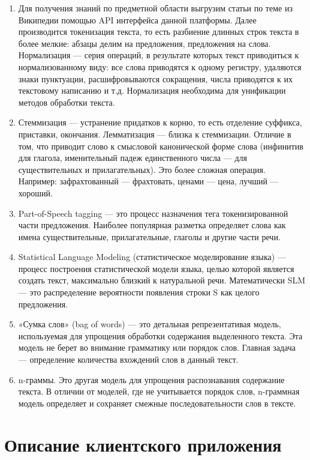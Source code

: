 \documentclass[a4paper,12pt,preview]{report} %
\begin{document}
	\begin{enumerate}
	\item Для получения знаний по предметной области выгрузим статьи по теме из Википедии помощью API интерфейса данной платформы. Далее производится токенизация текста, то есть разбиение длинных строк текста в более мелкие: абзацы делим на предложения, предложения на слова. Нормализация — серия операций, в результате которых текст приводиться к нормализованному виду: все слова приводятся к одному регистру, удаляются знаки пунктуации, расшифровываются сокращения, числа приводятся к их текстовому написанию и т.д. Нормализация необходима для унификации методов обработки текста.
	\item Стеммизация —  устранение придатков к корню, то есть отделение суффикса, приставки, окончания. Лемматизация — близка к стеммизации. Отличие в том, что приводит слово к смысловой канонической форме слова (инфинитив для глагола, именительный падеж единственного числа — для существительных и прилагательных). Это более сложная операция. Например: зафрахтованный — фрахтовать,  ценами — цена, лучший — хороший.
	\item Part-of-Speech tagging — это процесс назначения тега токенизированной части предложения. Наиболее популярная разметка определяет слова как имена существительные, прилагательные, глаголы и другие части речи.
	\item Statistical Language Modeling (статистическое моделирование языка) — процесс построения статистической модели языка, целью которой является создать текст, максимально близкий к натуральной речи. Математически SLM — это распределение вероятности появления строки S как целого предложения.
	\item «Сумка слов» (bag of words) — это детальная репрезентативая модель, используемая для упрощения обработки содержания выделенного текста. Эта модель не берет во внимание грамматику или порядок слов. Главная задача — определение количества вхождений слов в данный текст.
	\item n-граммы. Это другая модель для упрощения распознавания содержание текста. В отличии от моделей, где не учитывается порядок слов, n-граммная модель определяет и сохраняет смежные последовательности слов в тексте.
	\end{enumerate}
	
	\chapter{Описание клиентского приложения}
	
\end{document}
